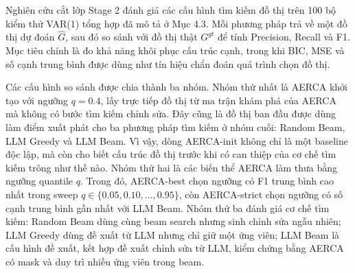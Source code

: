 Nghiên cứu cắt lớp Stage 2 đánh giá các cấu hình tìm kiếm đồ thị trên 100 bộ kiểm thử VAR(1) tổng hợp đã mô tả ở Mục 4.3. Mỗi phương pháp trả về một đồ thị dự đoán \(\hat{G}\), sau đó so sánh với đồ thị thật \(G^{gt}\) để tính Precision, Recall và F1. Mục tiêu chính là đo khả năng khôi phục cấu trúc cạnh, trong khi BIC, MSE và số cạnh trung bình được dùng như tín hiệu chẩn đoán quá trình chọn đồ thị.

Các cấu hình so sánh được chia thành ba nhóm. Nhóm thứ nhất là AERCA khởi tạo với ngưỡng \(q=0.4\), lấy trực tiếp đồ thị từ ma trận khám phá của AERCA mà không có bước tìm kiếm chỉnh sửa. Đây cũng là đồ thị ban đầu được dùng làm điểm xuất phát cho ba phương pháp tìm kiếm ở nhóm cuối: Random Beam, LLM Greedy và LLM Beam. Vì vậy, dòng AERCA-init không chỉ là một baseline độc lập, mà còn cho biết cấu trúc đồ thị trước khi có can thiệp của cơ chế tìm kiếm trông như thế nào. Nhóm thứ hai là các biến thể AERCA làm thưa bằng ngưỡng quantile \(q\). Trong đó, AERCA-best chọn ngưỡng có F1 trung bình cao nhất trong sweep \(q\in\{0.05,0.10,\ldots,0.95\}\), còn AERCA-strict chọn ngưỡng có số cạnh trung bình gần nhất với LLM Beam. Nhóm thứ ba đánh giá cơ chế tìm kiếm: Random Beam dùng cùng beam search nhưng sinh chỉnh sửa ngẫu nhiên; LLM Greedy dùng đề xuất từ LLM nhưng chỉ giữ một ứng viên; LLM Beam là cấu hình đề xuất, kết hợp đề xuất chỉnh sửa từ LLM, kiểm chứng bằng AERCA có mask và duy trì nhiều ứng viên trong beam.

\begin{table}[htbp]
\centering
\caption{Nghiên cứu cắt lớp Stage 2 trên 100 bộ VAR(1) tổng hợp.}
\label{tab:graph-search-slice-study}
\end{table}

